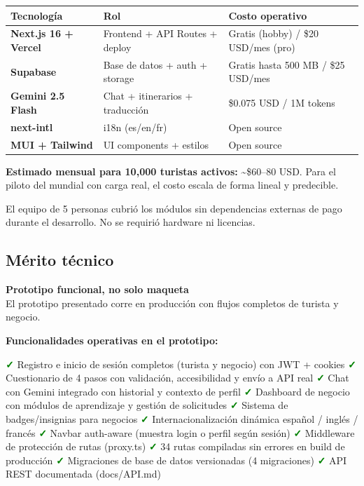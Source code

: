 \documentclass[11pt,a4paper]{article}
\newcommand{\criterio}[2]{
  \vspace{0.3cm}
  \noindent\colorbox{primary!10}{\parbox{\dimexpr\linewidth-2\fboxsep}{%
    \textbf{\textcolor{primary}{#1}}\\[2pt]
    \small\textcolor{dark}{#2}
  }}
  \vspace{0.3cm}
}
\newcommand{\feature}[1]{\textcolor{green}{\textbf{✓}} #1}
\begin{document}
\begin{center}
\begin{tabular}{>{\bfseries}p{3.5cm} p{4.5cm} p{5cm}}
\toprule
Tecnología & Rol & Costo operativo \\
\midrule
Next.js 16 + Vercel    & Frontend + API Routes + deploy & Gratis (hobby) / \$20 USD/mes (pro) \\
Supabase               & Base de datos + auth + storage & Gratis hasta 500 MB / \$25 USD/mes \\
Gemini 2.5 Flash       & Chat + itinerarios + traducción & \$0.075 USD / 1M tokens \\
next-intl              & i18n (es/en/fr)                & Open source \\
MUI + Tailwind         & UI components + estilos        & Open source \\
\bottomrule
\end{tabular}
\end{center}

\textbf{Estimado mensual para 10{,}000 turistas activos:} \textasciitilde\$60--80 USD. Para el
piloto del mundial con carga real, el costo escala de forma lineal y predecible.

El equipo de 5 personas cubrió los módulos sin dependencias externas de pago
durante el desarrollo. No se requirió hardware ni licencias.

\subsection{Mérito técnico}

\criterio{Prototipo funcional, no solo maqueta}
{El prototipo presentado corre en producción con flujos completos
de turista y negocio.}

\textbf{Funcionalidades operativas en el prototipo:}

\begin{itemize}[leftmargin=*, itemsep=2pt]
  \feature{Registro e inicio de sesión completos (turista y negocio) con JWT + cookies}
  \feature{Cuestionario de 4 pasos con validación, accesibilidad y envío a API real}
  \feature{Chat con Gemini integrado con historial y contexto de perfil}
  \feature{Dashboard de negocio con módulos de aprendizaje y gestión de solicitudes}
  \feature{Sistema de badges/insignias para negocios}
  \feature{Internacionalización dinámica español / inglés / francés}
  \feature{Navbar auth-aware (muestra login o perfil según sesión)}
  \feature{Middleware de protección de rutas (proxy.ts)}
  \feature{34 rutas compiladas sin errores en build de producción}
  \feature{Migraciones de base de datos versionadas (4 migraciones)}
  \feature{API REST documentada (docs/API.md)}
\end{itemize}
\end{document}
